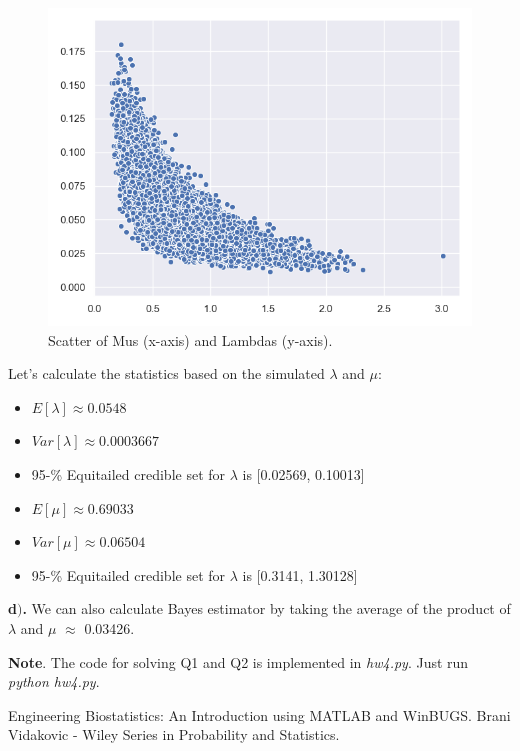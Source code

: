 \documentclass[a4 paper]{article}
\begin{document}
\begin{figure}[H]
	\includegraphics[scale=0.4]{q2c}
	\centering
	\caption{Scatter of Mus (x-axis) and Lambdas (y-axis).}
	\label{q2c}
\end{figure}

Let's calculate the statistics based on the simulated 
$\lambda$ and $\mu$:
\begin{itemize}
	\item $E\left[\lambda\right]\approx0.0548$
	\item $Var\left[\lambda\right]\approx0.0003667$
	\item 95-\% Equitailed credible set for $\lambda$ is [0.02569, 0.10013]
	\item $E\left[\mu\right]\approx0.69033$
	\item $Var\left[\mu\right]\approx0.06504$
	\item 95-\% Equitailed credible set for $\lambda$ is [0.3141, 1.30128]
\end{itemize}



\textbf{d$)$.} We can also calculate 
Bayes estimator by taking 
the average of the product of
$\lambda$ and $\mu$ $\approx$ 0.03426.



\textbf{Note}. The code for solving Q1 and Q2
is implemented in \textit{hw4.py}.
Just run \textit{python hw4.py}.



\begin{thebibliography}{9}


\label{stat} 
Engineering Biostatistics: An Introduction using MATLAB and WinBUGS. 
Brani Vidakovic - Wiley Series in Probability and Statistics.

\end{thebibliography}
\end{document}
